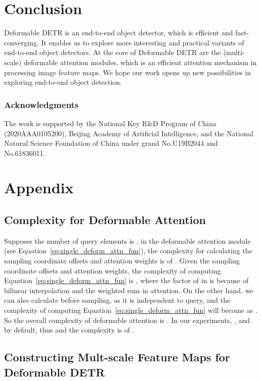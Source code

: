\documentclass{article}
\begin{document}
 \section{Conclusion}

Deformable DETR is an end-to-end object detector, which is efficient and fast-converging. It enables us to explore more interesting and practical variants of end-to-end object detectors. At the core of Deformable DETR are the (multi-scale) deformable attention modules, which is an efficient attention mechanism in processing image feature maps. We hope our work opens up new possibilities in exploring end-to-end object detection.


 

\subsubsection*{Acknowledgments}
The work is supported by the National Key R\&D Program of China (2020AAA0105200), Beijing Academy of Artificial Intelligence, and the National Natural Science Foundation of China under grand No.U19B2044 and No.61836011.




\clearpage
\appendix
\section{Appendix}

\subsection{Complexity for Deformable Attention}
\label{sec:complexity}
Supposes the number of query elements is , in the deformable attention module (see Equation~\ref{eq:single_deform_attn_fun}), the complexity for calculating the sampling coordinate offsets  and attention weights  is of .
Given the sampling coordinate offsets and attention weights, the complexity of computing Equation~\ref{eq:single_deform_attn_fun} is , where the factor of  in  is because of bilinear interpolation and the weighted sum in attention. On the other hand, we can also calculate  before sampling, as it is independent to query, and the complexity of computing Equation~\ref{eq:single_deform_attn_fun} will become as . So the overall complexity of deformable attention is  . In our experiments, ,  and  by default, thus  and the complexity is of .

\subsection{Constructing Mult-scale Feature Maps for Deformable DETR}
\label{sec:build_ms_feature}
\end{document}
